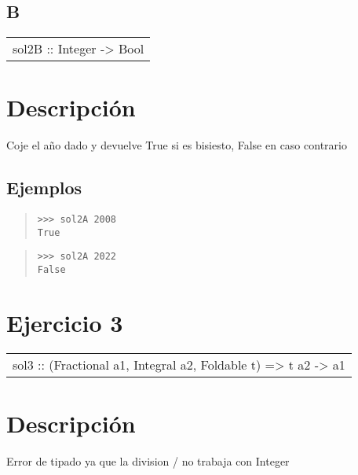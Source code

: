 \subsection{B}
\begin{haddockdesc}
\item[\begin{tabular}{@{}l}
sol2B :: Integer -> Bool
\end{tabular}]
{\haddockbegindoc
\section*{Descripción}
Coje el año dado y devuelve True si es bisiesto, False en caso contrario\par
\subsection*{Ejemplos}
\begin{quote}
{\haddockverb\begin{verbatim}
>>> sol2A 2008
True

\end{verbatim}}
\end{quote}
\begin{quote}
{\haddockverb\begin{verbatim}
>>> sol2A 2022
False

\end{verbatim}}
\end{quote}}
\end{haddockdesc}
\section{Ejercicio 3}
\begin{haddockdesc}
\item[\begin{tabular}{@{}l}
sol3 :: (Fractional a1, Integral a2, Foldable t) => t a2 -> a1
\end{tabular}]
{\haddockbegindoc
\section*{Descripción}
Error de tipado ya que la division / no trabaja con Integer\par}
\end{haddockdesc}
